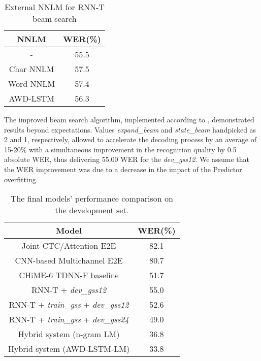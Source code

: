 \documentclass[a4paper]{article}
\begin{document}
\begin{table}[ht]
  \caption{External NNLM for RNN-T beam search}
  \label{tab:external_nnlm}
  \centering
  \begin{tabular}{c c}
    \toprule
    \textbf{NNLM} & \textbf{WER(\%)} \\
    \midrule
    - & 55.5 \\
    \midrule
    Char NNLM & 57.5 \\
    \midrule
    Word NNLM & 57.4 \\
    \midrule
    AWD-LSTM & 56.3 \\
    \bottomrule
  \end{tabular}
\end{table}

The improved beam search algorithm, implemented according to \cite{jain2019rnnt}, demonstrated results beyond expectations. Values \textit{expand\_beam} and \textit{state\_beam} handpicked as 2 and 1, respectively, allowed to accelerate the decoding process by an average of 15-20\% with a simultaneous improvement in the recognition quality by 0.5 absolute WER, thus delivering 55.00 WER for the \textit{dev\_gss12}. We assume that the WER improvement was due to a decrease in the impact of the Predictor overfitting.

\begin{table}[ht]
  \caption{The final models' performance comparison on the development set.}
  \label{tab:final_all}
  \centering
  \begin{tabular}{c c}
    \toprule
    \textbf{Model} & \textbf{WER(\%)} \\
    \midrule
    Joint CTC/Attention E2E \cite{chime5_e2e} & 82.1 \\
    CNN-based Multichannel E2E \cite{yalta2018cnnbased} & 80.7 \\
    CHiME-6 TDNN-F baseline \cite{chime6} & 51.7 \\
    \midrule
    RNN-T + \textit{dev\_gss12} & 55.0 \\
    RNN-T + \textit{train\_gss} + \textit{dev\_gss12} & 52.6 \\    
    RNN-T + \textit{train\_gss} + \textit{dev\_gss24} & 49.0 \\
    \midrule
    Hybrid system (n-gram LM) \cite{Medennikov_chime6} & 36.8 \\
    Hybrid system (AWD-LSTM-LM) \cite{Medennikov_chime6} & 33.8 \\
    \bottomrule
  \end{tabular}
\end{table}
\end{document}
